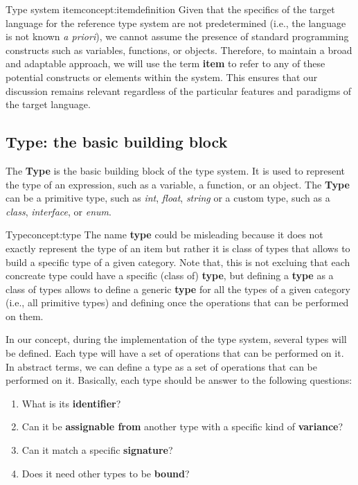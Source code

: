 \begin{mydefinition}{Type system item}{concept:itemdefinition}
    Given that the specifics of the target language for the reference type system are not predetermined (i.e., the language is not known \textit{a priori}), we cannot assume the presence of standard programming constructs such as variables, functions, or objects. Therefore, to maintain a broad and adaptable approach, we will use the term \textbf{item} to refer to any of these potential constructs or elements within the system. This ensures that our discussion remains relevant regardless of the particular features and paradigms of the target language.
\end{mydefinition}

\subsection{Type: the basic building block}\label{subsec:concept:TypeTheBasicBuildingBlock}

The \textbf{Type} is the basic building block of the type system. It is used to represent the type of an expression, such as a variable, a function, or an object. The \textbf{Type} can be a primitive type, such as \textit{int}, \textit{float}, \textit{string} or a custom type, such as a \textit{class}, \textit{interface}, or \textit{enum}.

\begin{mydefinition}{Type}{concept:type}
The name \textbf{type} could be misleading because it does not exactly represent the type of an item but rather it is class of types that allows to build a specific type of a given category. Note that, this is not excluing that each concreate type could have a specific (class of) \textbf{type}, but defining a \textbf{type} as a class of types allows to define a generic \textbf{type} for all the types of a given category (i.e., all primitive types) and defining once the operations that can be performed on them.
\end{mydefinition}

In our concept, during the implementation of the type system, several types will be defined. Each type will have a set of operations that can be performed on it. In abstract terms, we can define a type as a set of operations that can be performed on it.
Basically, each type should be answer to the following questions:
\begin{enumerate}
    \item What is its \textbf{identifier}?
    \item Can it be \textbf{assignable from} another type with a specific kind of \textbf{variance}?
    \item Can it match a specific \textbf{signature}?
    \item Does it need other types to be \textbf{bound}?
\end{enumerate}

